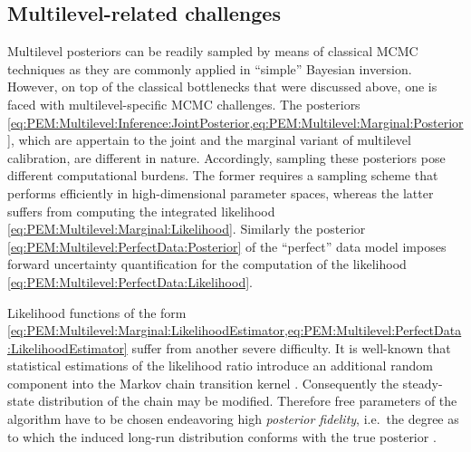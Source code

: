 \subsection{Multilevel-related challenges} \label{sec:PEM:Computations:MultilevelChallenges}
Multilevel posteriors can be readily sampled by means of classical MCMC techniques as they are commonly applied in ``simple'' Bayesian inversion.
However, on top of the classical bottlenecks that were discussed above, one is faced with multilevel-specific MCMC challenges.
The posteriors \cref{eq:PEM:Multilevel:Inference:JointPosterior,eq:PEM:Multilevel:Marginal:Posterior}, which are appertain to the joint and the marginal variant of multilevel calibration, are different in nature.
Accordingly, sampling these posteriors pose different computational burdens.
The former requires a sampling scheme that performs efficiently in high-dimensional parameter spaces, whereas the latter suffers from computing the integrated likelihood \cref{eq:PEM:Multilevel:Marginal:Likelihood}.
Similarly the posterior \cref{eq:PEM:Multilevel:PerfectData:Posterior} of the ``perfect'' data model imposes forward uncertainty quantification for the computation of the likelihood \cref{eq:PEM:Multilevel:PerfectData:Likelihood}.
\par %
Likelihood functions of the form \cref{eq:PEM:Multilevel:Marginal:LikelihoodEstimator,eq:PEM:Multilevel:PerfectData:LikelihoodEstimator} suffer from another severe difficulty.
It is well-known that statistical estimations of the likelihood ratio introduce an additional random component into the Markov chain transition kernel \cite{MCMC:ONeill2000,MCMC:Bal2013}.
Consequently the steady-state distribution of the chain may be modified.
Therefore free parameters of the algorithm have to be chosen endeavoring high \textit{posterior fidelity},
i.e.\ the degree as to which the induced long-run distribution conforms with the true posterior \cite{Nagel:SciTech2014:Proc,Nagel:JAIS2015}.

